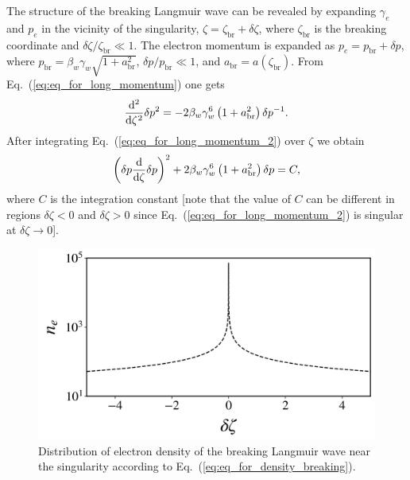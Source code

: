 \documentclass[10pt, a4paper, twoside, openright]{report}
\begin{document}
The structure of the breaking Langmuir wave can be revealed by expanding $ \gamma_e $ and $ p_e $ in the vicinity of the singularity, $ \zeta = \zeta_{\mathrm{br}} + \delta \zeta  $, where $ \zeta_{\mathrm{br}} $ is the breaking coordinate and $ \delta \zeta / \zeta_{\mathrm{br}} \ll 1 $. The electron momentum is expanded as $ p_e = p_{\mathrm{br}} + \delta p $, where $ p_{\mathrm{br}} = \beta_w \gamma_w \sqrt{1 + a_{\mathrm{br}}^2} $, $ \delta p / p_{\mathrm{br}} \ll 1 $, and $ a_{\mathrm{br}} = a \left( \zeta_{\mathrm{br}} \right) $. From Eq.~(\ref{eq:eq_for_long_momentum}) one gets \cite{Panchenko2008, Bulanov2013}
\begin{equation}\label{eq:eq_for_long_momentum_2}
\diff*[2]{\delta p^2 }{\zeta} = -2 \beta_w \gamma_w^6 \left( 1 + a_{\mathrm{br}}^2 \right) \delta p^{-1}.
\end{equation}
After integrating Eq.~(\ref{eq:eq_for_long_momentum_2}) over $ \zeta $ we obtain \cite{Panchenko2008, Bulanov2013}
\begin{equation}\label{eq:eq_for_long_momentum_3}
\left( \delta p \diff*{\delta p}{\zeta} \right)^2 + 2 \beta_w \gamma_w^6 \left( 1 + a_{\mathrm{br}}^2 \right) \delta p = C,
\end{equation}
where $ C $ is the integration constant [note that the value of $ C $ can be different in regions $ \delta \zeta < 0 $ and $ \delta \zeta > 0 $ since Eq.~(\ref{eq:eq_for_long_momentum_2}) is singular at $ \delta \zeta \rightarrow 0 $].

\begin{figure}[t]
	\includegraphics[width=0.5\linewidth]{img/breaking_wave.jpg}
	\caption[]{\label{fig:breaking_wave} Distribution of electron density of the breaking Langmuir wave near the singularity according to Eq.~(\ref{eq:eq_for_density_breaking}).}
\end{figure}
\end{document}

